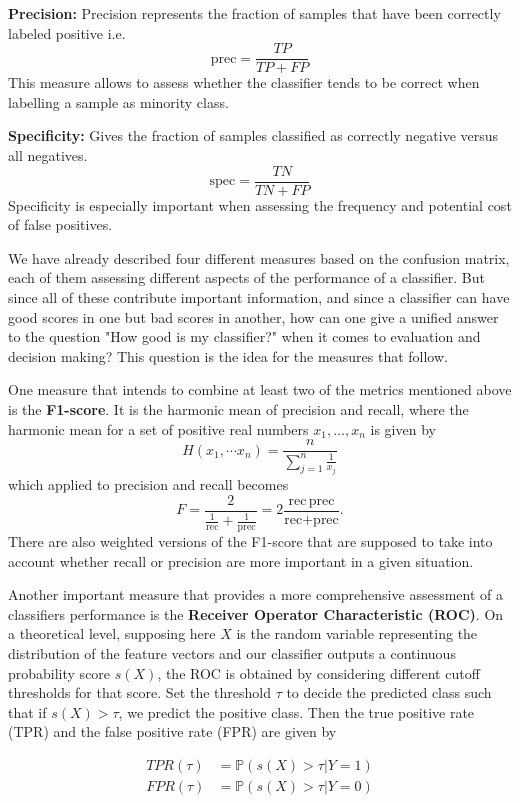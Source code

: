 \textbf{Precision:}
Precision represents the fraction of samples that have been correctly labeled positive i.e.
\[
	\text{prec} = \frac{TP}{TP + FP}
\]
This measure allows to assess whether the classifier tends to be correct when labelling a sample as minority class.

\textbf{Specificity:}
Gives the fraction of samples classified as correctly negative versus all negatives.
\[
	\text{spec} = \frac{TN}{TN + FP}
\]
Specificity is especially important when assessing the frequency and potential cost of false positives.

We have already described four different measures based on the confusion matrix, each of them assessing different aspects of the performance of a classifier.
But since all of these contribute important information, and since a classifier can have good scores in one but bad scores in another, 
how can one give a unified answer to the question "How good is my classifier?" when it comes to evaluation and decision making?
This question is the idea for the measures that follow.

One measure that intends to combine at least two of the metrics mentioned above is the \textbf{F1-score}.
It is the harmonic mean of precision and recall, where the harmonic mean for a set of positive real numbers $x_1, \dots, x_n$ is given by
\[
	H(x_1, \dotsm x_n) = \frac{n}{\sum_{j=1}^n \frac{1}{x_j}}
\]
which applied to precision and recall becomes
\[
	F = \frac{2}{ \frac{1}{\text{rec}} + \frac{1}{\text{prec}} } = 2 \frac{\text{rec} \, \text{prec}}{ \text{rec} + \text{prec} }.
\]
There are also weighted versions of the F1-score that are supposed to take into account whether recall or precision are more important in a given situation.


Another important measure that provides a more comprehensive assessment of a classifiers performance is the \textbf{Receiver Operator Characteristic (ROC)}.
On a theoretical level, supposing here $X$ is the random variable representing the distribution of the feature vectors 
and our classifier outputs a continuous probability score $s(X)$, the ROC is obtained by considering different cutoff thresholds for that score.
Set the threshold $\tau$ to decide the predicted class such that if $s(X) > \tau$, we predict the positive class. 
Then the true positive rate (TPR) and the false positive rate (FPR) are given by

    	\begin{align*}
    		TPR(\tau) &= \mathbb{P}(s(X) > \tau | Y = 1) \\
    		FPR(\tau) &= \mathbb{P}(s(X) > \tau | Y = 0)
    	\end{align*}

